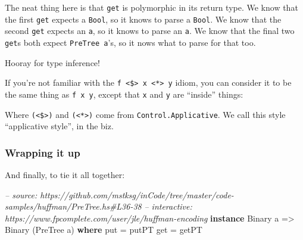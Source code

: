 \documentclass[]{article}
\newenvironment{Shaded}{}{}
\newcommand{\KeywordTok}[1]{\textcolor[rgb]{0.00,0.44,0.13}{\textbf{{#1}}}}
\newcommand{\DataTypeTok}[1]{\textcolor[rgb]{0.56,0.13,0.00}{{#1}}}
\newcommand{\DecValTok}[1]{\textcolor[rgb]{0.25,0.63,0.44}{{#1}}}
\newcommand{\CommentTok}[1]{\textcolor[rgb]{0.38,0.63,0.69}{\textit{{#1}}}}
\newcommand{\OtherTok}[1]{\textcolor[rgb]{0.00,0.44,0.13}{{#1}}}
\newcommand{\FunctionTok}[1]{\textcolor[rgb]{0.02,0.16,0.49}{{#1}}}
\newcommand{\NormalTok}[1]{{#1}}
\begin{document}
The neat thing here is that \texttt{get} is polymorphic in its return
type. We know that the first \texttt{get} expects a \texttt{Bool}, so it
knows to parse a \texttt{Bool}. We know that the second \texttt{get}
expects an \texttt{a}, so it knows to parse an \texttt{a}. We know that
the final two \texttt{get}s both expect \texttt{PreTree\ a}'s, so it
nows what to parse for that too.

Hooray for type inference!

If you're not familiar with the
\texttt{f\ \textless{}\$\textgreater{}\ x\ \textless{}*\textgreater{}\ y}
idiom, you can consider it to be the same thing as \texttt{f\ x\ y},
except that \texttt{x} and \texttt{y} are ``inside'' things:

\begin{Shaded}
\end{Shaded}

Where \texttt{(\textless{}\$\textgreater{})} and
\texttt{(\textless{}*\textgreater{})} come from
\texttt{Control.Applicative}. We call this style ``applicative style'',
in the biz.

\subsubsection{Wrapping it up}\label{wrapping-it-up}

And finally, to tie it all together:

\begin{Shaded}
\begin{Highlighting}[]
\CommentTok{-- source: https://github.com/mstksg/inCode/tree/master/code-samples/huffman/PreTree.hs#L36-38}
\CommentTok{-- interactive: https://www.fpcomplete.com/user/jle/huffman-encoding}
\KeywordTok{instance} \DataTypeTok{Binary} \NormalTok{a }\OtherTok{=>} \DataTypeTok{Binary} \NormalTok{(}\DataTypeTok{PreTree} \NormalTok{a) }\KeywordTok{where}
    \NormalTok{put }\FunctionTok{=} \NormalTok{putPT}
    \NormalTok{get }\FunctionTok{=} \NormalTok{getPT}
\end{Highlighting}
\end{Shaded}
\end{document}

